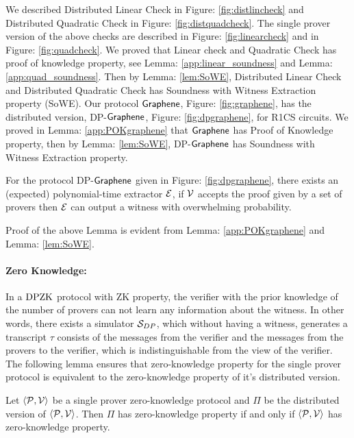 We described Distributed Linear Check in Figure: \ref{fig:distlincheck} and Distributed Quadratic Check in Figure: \ref{fig:distquadcheck}. The single prover version of the above checks are described in Figure: \ref{fig:linearcheck} and in Figure: \ref{fig:quadcheck}. We proved that Linear check and Quadratic Check has proof of knowledge property, see Lemma: \ref{app:linear_soundness} and Lemma: \ref{app:quad_soundness}. Then by Lemma: \ref{lem:SoWE}, Distributed Linear Check and Distributed Quadratic Check has Soundness with Witness Extraction property (SoWE). Our protocol $\textsf{Graphene}$, Figure: \ref{fig:graphene}, has the distributed version, DP-$\textsf{Graphene}$, Figure: \ref{fig:dpgraphene}, for R1CS circuits. We proved in Lemma: \ref{app:POKgraphene} that $\textsf{Graphene}$ has Proof of Knowledge property, then by Lemma: \ref{lem:SoWE}, DP-$\textsf{Graphene}$ has Soundness with Witness Extraction property. 
\begin{lemma}
	For the protocol DP-$\textsf{Graphene}$ given in Figure: \ref{fig:dpgraphene}, there exists an (expected) polynomial-time extractor $\mathcal{E}$, if $\mathcal{V}$ accepts the proof given by a set of provers then $\mathcal{E}$ can output a witness with overwhelming probability.
\end{lemma}
	Proof of the above Lemma is evident from Lemma: \ref{app:POKgraphene} and Lemma: \ref{lem:SoWE}.
\paragraph{Zero Knowledge:} In a $\text{DPZK}$ protocol with ZK property, the verifier with the prior knowledge of the number of provers can not learn any information about the witness. In other words, there exists a simulator $\mathcal{S}_{DP}$, which without having a witness, generates a transcript $\tau$ consists of the messages from the verifier and the messages from the provers to the verifier, which is indistinguishable from the view of the verifier. 
The following lemma ensures that zero-knowledge property for the single prover protocol is equivalent to the zero-knowledge property of it's distributed version.

\begin{lemma}\label{lem:ZK}
	Let $\langle \mathcal{P},\mathcal{V}\rangle$ be a single prover zero-knowledge protocol and $\Pi$ be the distributed version of $\langle \mathcal{P},\mathcal{V}\rangle$. Then $\Pi$ has zero-knowledge property if and only if $\langle \mathcal{P},\mathcal{V}\rangle$ has zero-knowledge property.
\end{lemma}

